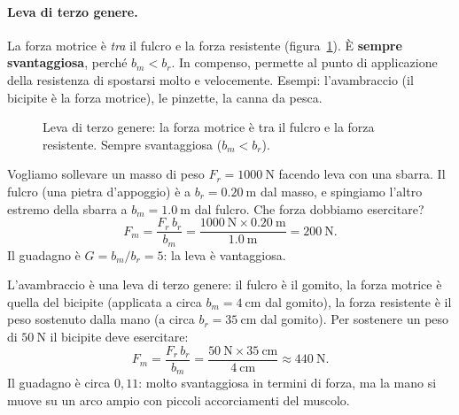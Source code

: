 \paragraph{Leva di terzo genere.} La forza motrice è \emph{tra} il fulcro e la forza resistente (figura~\ref{fig:leva3}). È \textbf{sempre svantaggiosa}, perché $b_m < b_r$. In compenso, permette al punto di applicazione della resistenza di spostarsi molto e velocemente. Esempi: l'avambraccio (il bicipite è la forza motrice), le pinzette, la canna da pesca.

\begin{figure}[h!]
\centering
{}
\caption{Leva di terzo genere: la forza motrice è tra il fulcro e la forza resistente. Sempre svantaggiosa ($b_m < b_r$).}
\label{fig:leva3}
\end{figure}

\begin{testexample}
Vogliamo sollevare un masso di peso $F_r = \SI{1000}{\newton}$ facendo leva con una sbarra. Il fulcro (una pietra d'appoggio) è a $b_r = \SI{0,20}{\meter}$ dal masso, e spingiamo l'altro estremo della sbarra a $b_m = \SI{1,0}{\meter}$ dal fulcro. Che forza dobbiamo esercitare?
\[
F_m = \frac{F_r\,b_r}{b_m} = \frac{\SI{1000}{\newton}\times\SI{0,20}{\meter}}{\SI{1,0}{\meter}} = \SI{200}{\newton}.
\]
Il guadagno è $G = b_m/b_r = 5$: la leva è vantaggiosa.
\end{testexample}

\begin{testexample}
L'avambraccio è una leva di terzo genere: il fulcro è il gomito, la forza motrice è quella del bicipite (applicata a circa $b_m = \SI{4}{\centi\meter}$ dal gomito), la forza resistente è il peso sostenuto dalla mano (a circa $b_r = \SI{35}{\centi\meter}$ dal gomito). Per sostenere un peso di $\SI{50}{\newton}$ il bicipite deve esercitare:
\[
F_m = \frac{F_r\,b_r}{b_m} = \frac{\SI{50}{\newton}\times\SI{35}{\centi\meter}}{\SI{4}{\centi\meter}} \approx \SI{440}{\newton}.
\]
Il guadagno è circa $0,11$: molto svantaggiosa in termini di forza, ma la mano si muove su un arco ampio con piccoli accorciamenti del muscolo.
\end{testexample}


